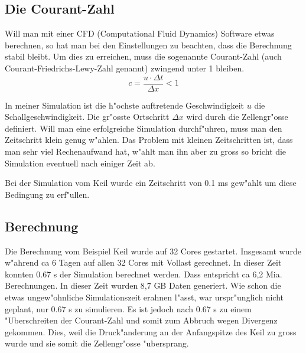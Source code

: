 \begin{refsection}
\subsection{Die Courant-Zahl}
Will man mit einer CFD (Computational Fluid Dynamics) Software etwas
berechnen, so hat man bei den Einstellungen zu beachten, dass die
Berechnung stabil bleibt. Um dies zu erreichen, muss die sogenannte
Courant-Zahl (auch Courant-Friedrichs-Lewy-Zahl genannt) zwingend unter
1 bleiben.
\[
c = \frac{u \cdot \Delta t}{\Delta x} < 1
\]

In meiner Simulation ist die h"ochste auftretende Geschwindigkeit $u$
die Schallgeschwindigkeit. Die gr"osste Ortschritt $\Delta x$ wird
durch die Zellengr"osse definiert. Will man eine erfolgreiche Simulation
durchf"uhren, muss man den Zeitschritt klein genug w"ahlen. Das Problem
mit kleinen Zeitschritten ist, dass man sehr viel Rechenaufwand hat,
w"ahlt man ihn aber zu gross so bricht die Simulation eventuell nach
einiger Zeit ab.

Bei der Simulation vom Keil wurde ein Zeitschritt von 0.1 ms gew"ahlt
um diese Bedingung zu erf"ullen.

\subsection{Berechnung}
Die Berechnung vom Beispiel Keil wurde auf 32 Cores gestartet. Insgesamt
wurde w"ahrend ca 6 Tagen auf allen 32 Cores mit Vollast gerechnet. In
dieser Zeit konnten 0.67 s der Simulation berechnet werden. Dass
entspricht ca 6,2 Mia. Berechnungen. In dieser Zeit wurden 8,7 GB Daten
generiert. Wie schon die etwas ungew"ohnliche Simulationszeit erahnen
l"asst, war urspr"unglich nicht geplant, nur 0.67 s zu simulieren. Es ist
jedoch nach 0.67 s zu einem "Uberschreiten der Courant-Zahl und somit
zum Abbruch wegen Divergenz gekommen. Dies, weil die Druck"anderung an
der Anfangspitze des Keil zu gross wurde und sie somit die Zellengr"osse
"ubersprang.


\end{refsection}
